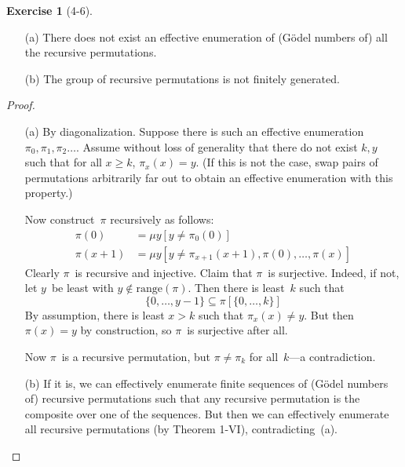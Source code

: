 \documentclass[letterpaper]{article}
\newcommand{\ran}{\mathrm{range}}
\theoremstyle{definition}
\newtheorem*{exer}{Exercise}
\theoremstyle{remark}
\theoremstyle{direction}
\begin{document}
\begin{exer}[4-6]
\ 
\begin{enumerate}[itemsep=0pt]
\item[(a)] There does not exist an effective enumeration of (G\"odel numbers of) all the recursive permutations.
\item[(b)] The group of recursive permutations is not finitely generated.
\end{enumerate}
\end{exer}
\begin{proof}
\begin{enumerate}[itemsep=0pt]
\item[(a)] By diagonalization. Suppose there is such an effective enumeration $\pi_0,\pi_1,\pi_2\ldots$. Assume without loss of generality that there do not exist $k,y$ such that for all $x\ge k$, $\pi_x(x)=y$. (If this is not the case, swap pairs of permutations arbitrarily far out to obtain an effective enumeration with this property.)

Now construct~$\pi$ recursively as follows:
\begin{align*}
\pi(0)&=\mu y[y\ne\pi_0(0)]\\
\pi(x+1)&=\mu y[y\ne\pi_{x+1}(x+1),\pi(0),\ldots,\pi(x)]
\end{align*}
Clearly $\pi$~is recursive and injective. Claim that $\pi$~is surjective. Indeed, if not, let $y$~be least with $y\not\in\ran(\pi)$. Then there is least~$k$ such that
$$\{0,\ldots,y-1\}\subseteq\pi[\{0,\ldots,k\}]$$
By assumption, there is least $x>k$ such that $\pi_x(x)\ne y$. But then $\pi(x)=y$ by construction, so $\pi$~is surjective after all.

Now $\pi$~is a recursive permutation, but $\pi\ne\pi_k$ for all~$k$---a contradiction.

\item[(b)] If it is, we can effectively enumerate finite sequences of (G\"odel numbers of) recursive permutations such that any recursive permutation is the composite over one of the sequences. But then we can effectively enumerate all recursive permutations (by Theorem 1-VI), contradicting~(a).
\end{enumerate}
\end{proof}
\end{document}
